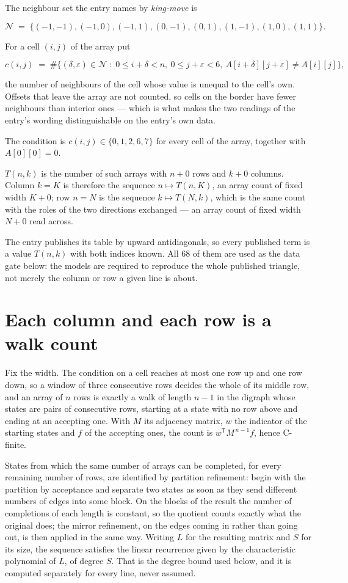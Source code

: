 \documentclass[11pt]{article}
\theoremstyle{definition}
\begin{document}
The neighbour set the entry names by {\itshape king-move} is

\[\mathcal{N} \;=\; \{(-1,-1), (-1,0), (-1,1), (0,-1), (0,1), (1,-1), (1,0), (1,1)\}.\]

For a cell $(i,j)$ of the array put

\[c(i,j) \;=\; \#\bigl\{(\delta,\varepsilon)\in\mathcal{N} \;:\; 0\le i+\delta<n,\ 0\le j+\varepsilon<6,\ A[i+\delta][j+\varepsilon] \neq A[i][j]\bigr\},\]

the number of neighbours of the cell whose value is unequal to the cell's own. Offsets that leave the array are not counted, so cells on the border have fewer neighbours than interior ones --- which is what makes the two readings of the entry's wording distinguishable on the entry's own data.

The condition is $c(i,j) \in \{0, 1, 2, 6, 7\}$ for every cell of the array, together with $A[0][0]=0$.

$T(n,k)$ is the number of such arrays with $n + 0$ rows and $k + 0$ columns. Column $k = K$ is therefore the sequence $n \mapsto T(n,K)$, an array count of fixed width $K + 0$; row $n = N$ is the sequence $k \mapsto T(N,k)$, which is the same count with the roles of the two directions exchanged --- an array count of fixed width $N + 0$ read across.

The entry publishes its table by upward antidiagonals, so every published term is a value $T(n,k)$ with both indices known. All 68 of them are used as the data gate below: the models are required to reproduce the whole published triangle, not merely the column or row a given line is about.

\section{Each column and each row is a walk count}

Fix the width. The condition on a cell reaches at most one row up and one row down, so a window of three consecutive rows decides the whole of its middle row, and an array of $n$ rows is exactly a walk of length $n-1$ in the digraph whose states are pairs of consecutive rows, starting at a state with no row above and ending at an accepting one. With $M$ its adjacency matrix, $w$ the indicator of the starting states and $f$ of the accepting ones, the count is $w^{\mathsf T}M^{\,n-1}f$, hence C-finite.

States from which the same number of arrays can be completed, for every remaining number of rows, are identified by partition refinement: begin with the partition by acceptance and separate two states as soon as they send different numbers of edges into some block. On the blocks of the result the number of completions of each length is constant, so the quotient counts exactly what the original does; the mirror refinement, on the edges coming in rather than going out, is then applied in the same way. Writing $L$ for the resulting matrix and $S$ for its size, the sequence satisfies the linear recurrence given by the characteristic polynomial of $L$, of degree $S$. That is the degree bound used below, and it is computed separately for every line, never assumed.
\end{document}
